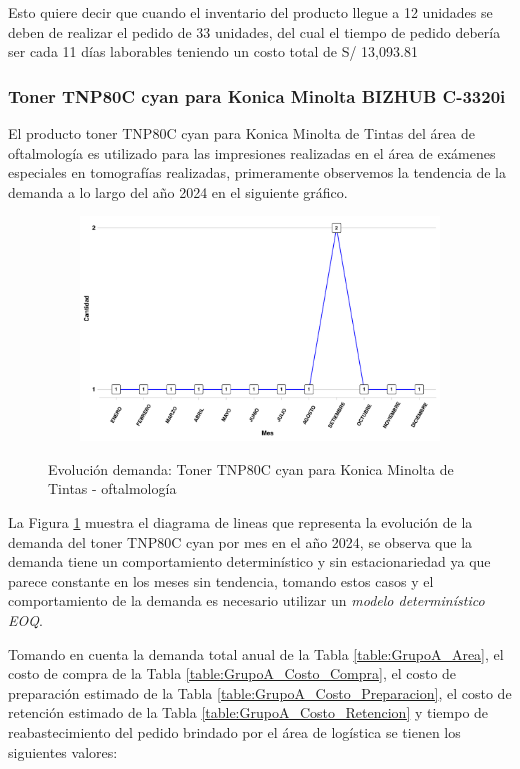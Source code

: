 Esto quiere decir que cuando el inventario del producto llegue a 12 unidades se deben de realizar el pedido de 33 unidades, del cual el tiempo de pedido debería ser cada 11 días laborables teniendo un costo total de S/ 13,093.81
\subsubsection{Toner TNP80C cyan para Konica Minolta BIZHUB C-3320i}

El producto toner TNP80C cyan para Konica Minolta de Tintas del área de oftalmología es utilizado para las impresiones realizadas en el área de exámenes especiales en tomografías realizadas, primeramente observemos la tendencia de la demanda a lo largo del año 2024 en el siguiente gráfico.
\clearpage
\begin{figure}[H]
  \caption{Evolución demanda: Toner TNP80C cyan para Konica Minolta de Tintas - oftalmología}
  {\includegraphics[width=15cm, height=5.95cm]{images/PROD012_demanda.pdf}}
  \label{fig:PROD012_demanda}
\end{figure}

La Figura \ref{fig:PROD012_demanda} muestra el diagrama de lineas que representa la evolución de la demanda del toner TNP80C cyan por mes en el año 2024, se observa que la demanda tiene un comportamiento determinístico y sin estacionariedad ya que parece constante en los meses sin tendencia, tomando estos casos y el comportamiento de la demanda es necesario utilizar un \textsl{modelo determinístico EOQ}.

Tomando en cuenta la demanda total anual de la Tabla \ref{table:GrupoA_Area}, el costo de compra de la Tabla \ref{table:GrupoA_Costo_Compra}, el costo de preparación estimado de la Tabla \ref{table:GrupoA_Costo_Preparacion}, el costo de retención estimado de la Tabla \ref{table:GrupoA_Costo_Retencion} y tiempo de reabastecimiento del pedido brindado por el área de logística se tienen los siguientes valores:

